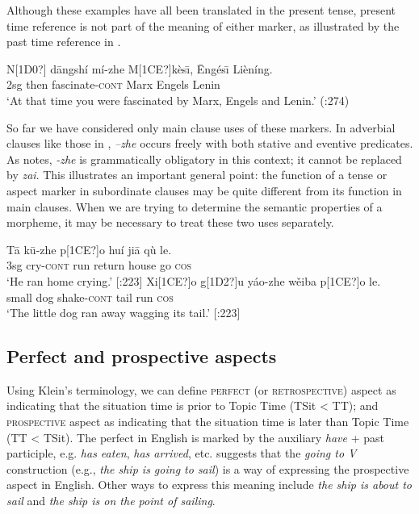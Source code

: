 Although these examples have all been translated in the present tense, present time reference is not part of the meaning of either marker, as illustrated by the past time reference in .


\ea
\gll N[1D0?]  d\=angshí  mí-zhe  M[1CE?]kès\={\i},  \=Engés\={\i}  Lièníng.\\
2sg  then  fascinate-\textsc{cont}  Marx  Engels  Lenin\\
\glt ‘At that time you were fascinated by Marx, Engels and Lenin.’  (\citealt{Smith1997}:274)
\z


So far we have considered only main clause uses of these markers. In adverbial clauses like those in , \textit{–zhe} occurs freely with both stative and eventive predicates. As \citet[275]{Smith1997} notes, \textit{-zhe} is grammatically obligatory in this context; it cannot be replaced by \textit{zai}. This illustrates an important general point: the function of a tense or aspect marker in subordinate clauses may be quite different from its function in main clauses. When we are trying to determine the semantic properties of a morpheme, it may be necessary to treat these two uses separately.


\ea
\ea \gll T\=a  k\=u-zhe  p[1CE?]o  huí  ji\=a  qù  le.\\
3sg  cry-\textsc{cont}  run  return  house  go  \textsc{cos}\\
\glt ‘He ran home crying.’  [\citealt{LiThompson1981}:223]
\ex \gll  Xi[1CE?]o  g[1D2?]u  yáo-zhe  wěiba  p[1CE?]o  le.\\
small  dog  shake-\textsc{cont}  tail  run  \textsc{cos}\\
\glt ‘The little dog ran away wagging its tail.’  [\citealt{LiThompson1981}:223]
\z \z

\subsection{Perfect and prospective aspects}\label{sec:} %

Using Klein’s terminology, we can define \textsc{perfect} (or \textsc{retrospective}) aspect as indicating that the situation time is prior to Topic Time (TSit < TT); and \textsc{prospective} aspect as indicating that the situation time is later than Topic Time (TT < TSit). The perfect in English is marked by the auxiliary \textit{have} + past participle, e.g. \textit{has eaten}, \textit{has arrived}, etc. \citet[64]{Comrie1976} suggests that the \textit{going to V} construction (e.g., \textit{the ship is going to sail}) is a way of expressing the prospective aspect in English. Other ways to express this meaning include \textit{the ship is about to sail} and \textit{the ship is on the point of sailing}.



